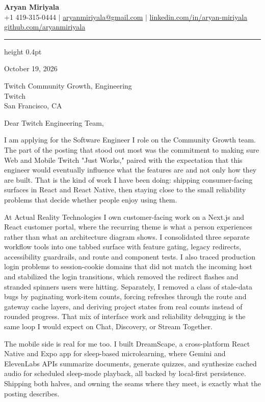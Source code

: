 \documentclass[letterpaper,11pt]{article}
\begin{document}
{\Large \textbf{Aryan Miriyala}}\\
\small
+1 419-315-0444 $|$ \href{mailto:aryanmiriyala@gmail.com}{aryanmiriyala@gmail.com} $|$ \href{https://www.linkedin.com/in/aryan-miriyala-7788a21b6/}{linkedin.com/in/aryan-miriyala}\\
\href{https://github.com/aryanmiriyala}{github.com/aryanmiriyala}

\vspace{2pt}
\hrule height 0.4pt
\vspace{10pt}

October 19, 2026

Twitch Community Growth, Engineering\\
Twitch\\
San Francisco, CA

\vspace{2pt}

Dear Twitch Engineering Team,

I am applying for the Software Engineer I role on the Community Growth team. The part of the posting that stood out most was the commitment to making sure Web and Mobile Twitch "Just Works," paired with the expectation that this engineer would eventually influence what the features are and not only how they are built. That is the kind of work I have been doing: shipping consumer-facing surfaces in React and React Native, then staying close to the small reliability problems that decide whether people enjoy using them.

At Actual Reality Technologies I own customer-facing work on a Next.js and React customer portal, where the recurring theme is what a person experiences rather than what an architecture diagram shows. I consolidated three separate workflow tools into one tabbed surface with feature gating, legacy redirects, accessibility guardrails, and route and component tests. I also traced production login problems to session-cookie domains that did not match the incoming host and stabilized the login transitions, which removed the redirect flashes and stranded spinners users were hitting. Separately, I removed a class of stale-data bugs by paginating work-item counts, forcing refreshes through the route and gateway cache layers, and deriving project states from real counts instead of rounded progress. That mix of interface work and reliability debugging is the same loop I would expect on Chat, Discovery, or Stream Together.

The mobile side is real for me too. I built DreamScape, a cross-platform React Native and Expo app for sleep-based microlearning, where Gemini and ElevenLabs APIs summarize documents, generate quizzes, and synthesize cached audio for scheduled sleep-mode playback, all backed by local-first persistence. Shipping both halves, and owning the seams where they meet, is exactly what the posting describes.
\end{document}
